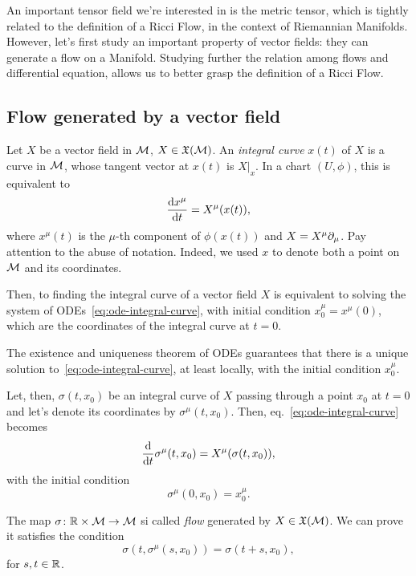 An important tensor field we're interested in is the metric tensor, which is tightly related to the definition of a Ricci Flow, in the context of Riemannian Manifolds. However, let's first study an important property of vector fields: they can generate a flow on a Manifold. Studying further the relation among flows and differential equation, allows us to better grasp the definition of a Ricci Flow.

\subsection{Flow generated by a vector field}
Let $X$ be a vector field in $\mathcal{M}$, $X \in \mathfrak{X}(\mathcal{M})$. An \emph{integral curve} $x(t)$ of $X$ is a curve in $\mathcal{M}$, whose tangent vector at $x(t)$ is $X|_x$. In a chart $(U,\phi)$, this is equivalent to
\begin{equation}\label{eq:ode-integral-curve}
    \frac{\mathop{}\!\mathrm{d} x^\mu}{\mathop{}\!\mathrm{d} t} = X^\mu(x(t)) ,
\end{equation}
where $x^\mu(t)$ is the $\mu$-th component of $\phi(x(t))$ and $X = X^\mu \partial_\mu$. Pay attention to the abuse of notation. Indeed, we used $x$ to denote both a point on $\mathcal{M}$ and its coordinates.

Then, to finding the integral curve of a vector field $X$ is equivalent to solving the system of ODEs~\eqref{eq:ode-integral-curve}, with initial condition $x^\mu_0 = x^\mu (0)$, which are the coordinates of the integral curve at $t=0$.

The existence and uniqueness theorem of ODEs guarantees that there is a unique solution to~\eqref{eq:ode-integral-curve}, at least locally, with the initial condition $x^\mu_0$.

Let, then, $\sigma(t,x_0)$ be an integral curve of $X$ passing through a point $x_0$ at $t=0$ and let's denote its coordinates by $\sigma^\mu(t,x_0)$. Then, eq.~\eqref{eq:ode-integral-curve} becomes
\begin{equation}\label{eq:ode-flow-coordinates}
    \frac{\mathop{}\!\mathrm{d}}{\mathop{}\!\mathrm{d} t} \sigma^\mu (t,x_0) = X^\mu (\sigma(t,x_0)),
\end{equation}
with the initial condition
\begin{equation}\label{eq:ode-flow-initial-condition}
    \sigma^\mu(0,x_0) = x^\mu_0.
\end{equation}

The map $\sigma \colon \mathbb{R} \times \mathcal{M} \to \mathcal{M}$ si called \emph{flow} generated by $X \in \mathfrak{X}(\mathcal{M})$. We can prove it satisfies the condition
\begin{equation}\label{eq:property-flow}
    \sigma(t, \sigma^\mu(s,x_0)) = \sigma(t+s,x_0),
\end{equation}
for $s,t \in \mathbb{R}$.

